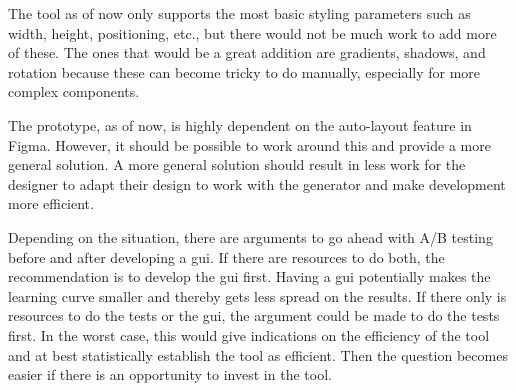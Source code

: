 The tool as of now only supports the most basic styling parameters such as width, height, positioning, etc., but there would not be much work to add more of these. The ones that would be a great addition are gradients, shadows, and rotation because these can become tricky to do manually, especially for more complex components. 

The prototype, as of now, is highly dependent on the auto-layout feature in Figma. However, it should be possible to work around this and provide a more general solution. A more general solution should result in less work for the designer to adapt their design to work with the generator and make development more efficient. 

Depending on the situation, there are arguments to go ahead with A/B testing before and after developing a \acrshort{gui}. If there are resources to do both, the recommendation is to develop the \acrshort{gui} first. Having a \acrshort{gui} potentially makes the learning curve smaller and thereby gets less spread on the results. If there only is resources to do the tests or the \acrshort{gui}, the argument could be made to do the tests first. In the worst case, this would give indications on the efficiency of the tool and at best statistically establish the tool as efficient. Then the question becomes easier if there is an opportunity to invest in the tool. 
